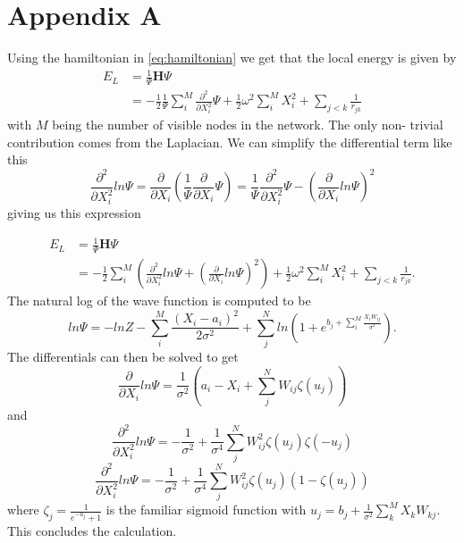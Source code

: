 \documentclass[11pt,a4paper,titlepage]{article}
\begin{document}
\section{Appendix A}\label{app_A}
Using the hamiltonian in \eqref{eq:hamiltonian} we get that the local energy is given by
$$
\begin{aligned}
E_{L} &=\frac{1}{\Psi} \mathbf{H} \Psi \\
&=-\frac{1}{2} \frac{1}{\Psi} \sum_{i}^{M} \frac{\partial^2}{\partial X_i^2} \Psi+\frac{1}{2} \omega^{2} \sum_{i}^{M} X_{i}^{2}+\sum_{j<k} \frac{1}{r_{j k}}
\end{aligned}
$$
with $M$ being the number of visible nodes in the network. The only non- trivial contribution comes from the Laplacian. We can simplify the differential term like this
$$
\frac{\partial^2}{\partial X_i^2} ln\Psi = \frac{\partial}{\partial X_i}\left( \frac{1}{\Psi}\frac{\partial}{\partial X_i} \Psi \right) = \frac{1}{\Psi}\frac{\partial^2}{\partial X_i^2} \Psi - \left( \frac{\partial}{\partial X_i} ln\Psi \right)^2
$$
giving us this expression

\begin{equation}\label{eq:local_energy_derived}
\begin{aligned}
E_{L} &=\frac{1}{\Psi} \mathbf{H} \Psi \\
&=-\frac{1}{2} \sum_{i}^{M} \left( \frac{\partial^2}{\partial X_i^2} ln\Psi +  \left( \frac{\partial}{\partial X_i} ln\Psi \right)^2 \right)+\frac{1}{2} \omega^{2} \sum_{i}^{M} X_{i}^{2}+\sum_{j<k} \frac{1}{r_{j k}}.
\end{aligned}
\end{equation}
The natural log of the wave function is computed to be
$$
ln\Psi = -ln Z-\sum_{i}^{M} \frac{\left(X_{i}-a_{i}\right)^{2}}{2 \sigma^{2}}+\sum_{j}^{N} ln \left(1+e^{b_{j}+\sum_{i}^{M} \frac{X_{i} W_{i j}}{\sigma^{2}}}\right).
$$
The differentials can then be solved to get
$$
\frac{\partial}{\partial X_i} ln \Psi=\frac{1}{\sigma^{2}}\left(a_i-X_i+\sum_{j}^{N} W_{ij}\zeta(u_j) \right)
$$
and
$$
\frac{\partial^{2}}{\partial X_{i}^{2}} ln \Psi=-\frac{1}{\sigma^{2}}+\frac{1}{\sigma^{4}} \sum_{j}^{N} W_{i j}^{2} \zeta(u_j) \zeta(-u_j) 
$$
\begin{equation}\label{eq:doubleDerivativeFinal}
\frac{\partial^{2}}{\partial X_{i}^{2}} ln \Psi=-\frac{1}{\sigma^{2}}+\frac{1}{\sigma^{4}} \sum_{j}^{N} W_{i j}^{2} \zeta(u_j) (1-\zeta(u_j))
\end{equation}
where $\zeta_j = \frac{1}{e^{-u_j}+1}$ is the familiar sigmoid function with $u_j = b_{j}+\frac{1}{\sigma^{2}} \sum_{k}^{M} X_k W_{k j}$. This concludes the calculation.
\end{document}
